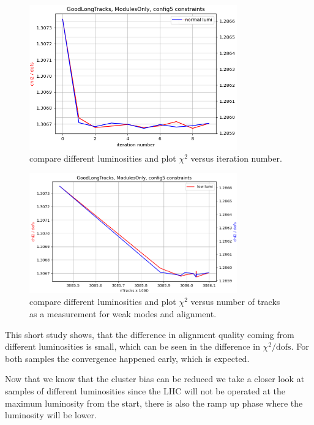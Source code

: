 \begin{figure}
  \centering
  \includegraphics[width=0.8\textwidth]{plots/renewed_plots/modules_chi2_c5.png}
  \caption{compare different luminosities and plot $\chi^2$ versus iteration number.}
  \label{fig:chi2iter_lumi_normal}
\end{figure}

\begin{figure}
  \centering
  \includegraphics[width=0.8\textwidth]{plots/jan_17_2022/chi2_tracks_modulesOnly.png}
  \caption{compare different luminosities and plot $\chi^2$ versus number of tracks as a measurement for weak modes and alignment.}
  \label{fig:chi2tracks_lumi_normal}
\end{figure}

This short study shows, that the difference in alignment quality coming from different luminosities is small, which can be seen in the difference in $\chi^2 / \text{dofs}$. For both samples the convergence happened early, which is expected.

Now that we know that the cluster bias can be reduced we take a closer look at samples of different luminosities since the LHC will not be operated at the maximum luminosity from the start, there is also the ramp up phase where the luminosity will be lower.

